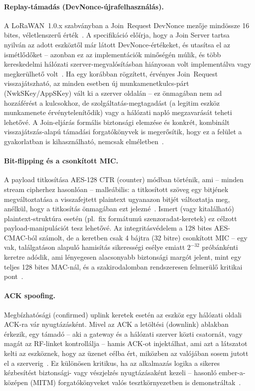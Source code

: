 \documentclass[12pt,a4paper]{article}
\begin{document}
\paragraph{Replay-támadás (DevNonce-újrafelhasználás).} A LoRaWAN~1.0.x
szabványban a Join~Request DevNonce mezője mindössze 16 bites, véletlenszerű
érték~\cite{yang2018}. A specifikáció előírja, hogy a Join Server tartsa
nyilván az adott eszköztől már látott DevNonce-értékeket, és utasítsa el az
ismétlődőket -- azonban ez az implementációk minőségén múlik, és több
kereskedelmi hálózati szerver-megvalósításban hiányosan volt implementálva
vagy megkerülhető volt~\cite{aras2017}. Ha egy korábban rögzített, érvényes
Join~Request visszajátszható, az minden esetben új munkamenetkulcs-párt
(NwkSKey/AppSKey) vált ki a szerver oldalán -- ez önmagában nem ad hozzáférést
a kulcsokhoz, de szolgáltatás-megtagadást (a legitim eszköz munkamenete
érvénytelenítődik) vagy a hálózati napló megzavarását teheti lehetővé. A
Join-eljárás formális biztonsági elemzése és konkrét, kombinált
visszajátszás-alapú támadási forgatókönyvek is megerősítik, hogy ez a
felület a gyakorlatban is kihasználható, nemcsak elméletben~\cite{Tomasin2017,
Le2021, Wesemeyer2020, Eldefrawy2019}.

\paragraph{Bit-flipping és a csonkított MIC.} A payload titkosítása AES-128
CTR (counter) módban történik, ami -- minden stream cipherhez hasonlóan --
malleábilis: a titkosított szöveg egy bitjének megváltoztatása a
visszafejtett plaintext ugyanazon bitjét változtatja meg, anélkül, hogy a
titkosítás önmagában ezt jelezné~\cite{yang2018}. Ismert (vagy kitalálható)
plaintext-struktúra esetén (pl.\ fix formátumú szenzoradat-keretek) ez
célzott payload-manipulációt tesz lehetővé. Az integritásvédelem a
128 bites AES-CMAC-ból számolt, de a keretben csak 4 bájtra (32 bitre)
csonkított MIC -- egy vak, találgatáson alapuló hamisítás sikerességi esélye
emiatt $2^{-32}$ próbánkénti keretre adódik, ami lényegesen alacsonyabb
biztonsági margót jelent, mint egy teljes 128 bites MAC-nál, és a
szakirodalomban rendszeresen felmerülő kritikai pont~\cite{butun2018}.

\paragraph{ACK spoofing.} Megbízhatósági (confirmed) uplink keretek esetén az
eszköz egy hálózati oldali ACK-ra vár nyugtázásként. Mivel az ACK a
letöltési (downlink) ablakban érkezik, egy támadó -- aki a gateway és a
hálózati szerver közti csatornát, vagy magát az RF-linket kontrollálja --
hamis ACK-ot injektálhat, ami azt a látszatot kelti az eszköznek, hogy az
üzenet célba ért, miközben az valójában sosem jutott el a
szerverig~\cite{aras2017}. Ez különösen kritikus, ha az alkalmazás logika a
sikeres kézbesítést biztonsági- vagy vészjelzés nyugtázásaként kezeli --
hasonló ember-a-középen (MITM) forgatókönyveket valós tesztkörnyezetben is
demonstráltak~\cite{Thomas2020, Pospisil2021}.
\end{document}
